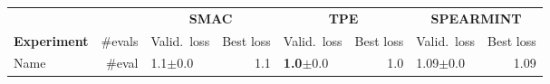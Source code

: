 \documentclass[landscape]{article} %
\begin{document}
\begin{table}[t]
\begin{tabularx}{\textwidth}{lr|Xr|Xr|Xr}
\toprule
\multicolumn{2}{l}{}&\multicolumn{2}{c}{\bf SMAC}&\multicolumn{2}{c}{\bf TPE}&\multicolumn{2}{c}{\bf SPEARMINT}\\
\multicolumn{1}{l}{\bf Experiment} &\multicolumn{1}{r}{\#evals}&\multicolumn{1}{l}{Valid.\ loss} &\multicolumn{1}{r}{Best loss}&\multicolumn{1}{l}{Valid.\ loss} &\multicolumn{1}{r}{Best loss}&\multicolumn{1}{l}{Valid.\ loss} &\multicolumn{1}{r}{Best loss}\\
\toprule
Name & \#eval & 1.1$\pm$0.0 & 1.1 & \textbf{1.0}$\pm$0.0 & 1.0 & 1.09$\pm$0.0 & 1.09 \\
\bottomrule
\end{tabularx}
\end{table}
\end{document}
